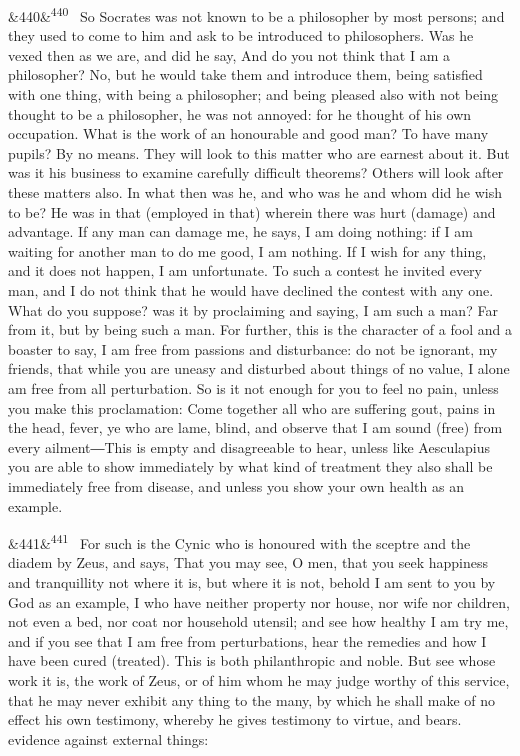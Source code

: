 \documentclass[12pt]{article}
\newcommand{\para}[1][]{\par\noindent\ifx&#1&\else\textsuperscript{\footnotesize #1}~\fi}
\begin{document}
\para[440] So Socrates was not known to be a philosopher by most persons; and they used to come to him and ask to be introduced to philosophers. Was he vexed then as we are, and did he say, And do you not think that I am a philosopher? No, but he would take them and introduce them, being satisfied with one thing, with being a philosopher; and being pleased also with not being thought to be a philosopher, he was not annoyed: for he thought of his own occupation. What is the work of an honourable and good man? To have many pupils? By no means. They will look to this matter who are earnest about it. But was it his business to examine carefully difficult theorems? Others will look after these matters also. In what then was he, and who was he and whom did he wish to be? He was in that (employed in that) wherein there was hurt (damage) and advantage. If any man can damage me, he says, I am doing nothing: if I am waiting for another man to do me good, I am nothing. If I wish for any thing, and it does not happen, I am unfortunate. To such a contest he invited every man, and I do not think that he would have declined the contest with any one. What do you suppose? was it by proclaiming and saying, I am such a man? Far from it, but by being such a man. For further, this is the character of a fool and a boaster to say, I am free from passions and disturbance: do not be ignorant, my friends, that while you are uneasy and disturbed about things of no value, I alone am free from all perturbation. So is it not enough for you to feel no pain, unless you make this proclamation: Come together all who are suffering gout, pains in the head, fever, ye who are lame, blind, and observe that I am sound (free) from every ailment―This is empty and disagreeable to hear, unless like Aesculapius you are able to show immediately by what kind of treatment they also shall be immediately free from disease, and unless you show your own health as an example.

\para[441] For such is the Cynic who is honoured with the sceptre and the diadem by Zeus, and says, That you may see, O men, that you seek happiness and tranquillity not where it is, but where it is not, behold I am sent to you by God as an example, I who have neither property nor house, nor wife nor children, not even a bed, nor coat nor household utensil; and see how healthy I am try me, and if you see that I am free from perturbations, hear the remedies and how I have been cured (treated). This is both philanthropic and noble. But see whose work it is, the work of Zeus, or of him whom he may judge worthy of this service, that he may never exhibit any thing to the many, by which he shall make of no effect his own testimony, whereby he gives testimony to virtue, and bears. evidence against external things:
\end{document}
